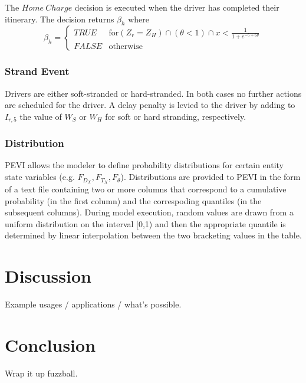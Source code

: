 \documentclass[journal]{IEEEtran}
\begin{document}
The $Home ~Charge$ decision is executed when the driver has completed their itinerary. The decision returns $\beta_h$ where 
\begin{equation}
  \beta_h = \begin{cases}
    TRUE & \text{for} (Z_r = Z_H) \cap (\theta < 1) \cap x < \frac{1}{1+e^{-5+6\theta}} \\
    FALSE & \text{otherwise}
  \end{cases}
\end{equation}
  
\subsubsection{Strand Event}\label{strandEv}

Drivers are either soft-stranded or hard-stranded.  In both cases no further actions are scheduled for the driver.  A delay penalty is levied to the driver by adding to $I_{r,5}$ the value of $W_S$ or $W_H$ for soft or hard stranding, respectively. 

\subsubsection{Distribution}\label{distSub}

PEVI allows the modeler to define probability distributions for certain entity state variables (e.g. $F_{D_X}, F_{T_X}, F_{\theta}$).  Distributions are provided to PEVI in the form of a text file containing two or more columns that correspond to a cumulative probability (in the first column) and the correspoding quantiles (in the subsequent columns).  During model execution, random values are drawn from a uniform distribution on the interval [0,1) and then the appropriate quantile is determined by linear interpolation between the two bracketing values in the table.

\section{Discussion}

Example usages / applications / what's possible.

\section{Conclusion}

Wrap it up fuzzball.

\end{document}
